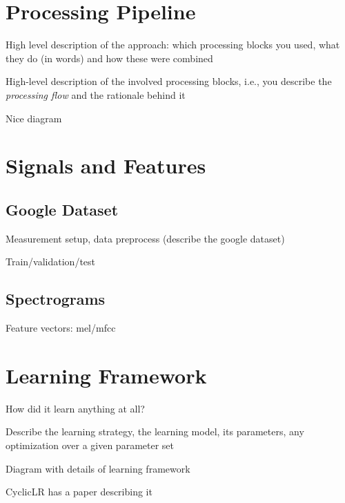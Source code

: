 
\section{Processing Pipeline}
\label{sec:processing_architecture}

High level description of the approach: which processing blocks you used, what they do (in words) and how these were combined

High-level description of the involved processing blocks, i.e., you describe the {\it processing flow} and the rationale behind it

Nice diagram

\section{Signals and Features}
\label{sec:model}

\subsection{Google Dataset}

Measurement setup, data preprocess (describe the google dataset)

Train/validation/test

\subsection{Spectrograms}

Feature vectors: mel/mfcc

\section{Learning Framework}
\label{sec:learning_framework}

How did it learn anything at all?

Describe the learning strategy, the learning model, its parameters, any optimization over a given parameter set

Diagram with details of learning framework

CyclicLR has a paper describing it
